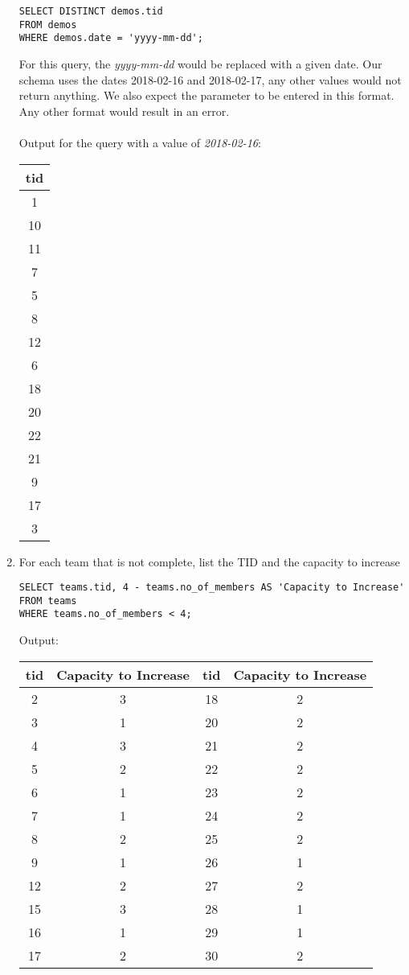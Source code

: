 \documentclass[11pt,letterpaper]{article}
\begin{document}
\begin{enumerate}
\begin{verbatim}
SELECT DISTINCT demos.tid 
FROM demos 
WHERE demos.date = 'yyyy-mm-dd';
\end{verbatim}
For this query, the \textit{yyyy-mm-dd} would be replaced with a given date. Our schema uses the dates 2018-02-16 and 2018-02-17, any other values would not return anything. We also expect the parameter to be entered in this format. Any other format would result in an error.\\
\\
Output for the query with a value of \textit{2018-02-16}:
\begin{center}
\begin{tabular}{ | c | }
 \hline
 tid \\
 \hline
 1 \\
 10 \\
 11 \\
 7 \\
 5 \\
 8 \\
 12 \\
 6 \\
 18 \\
 20 \\
 22 \\
 21 \\
 9 \\
 17 \\
 3 \\
 \hline
\end{tabular}
\end{center}

\item For each team that is not complete, list the TID and the capacity to increase

\begin{verbatim}
SELECT teams.tid, 4 - teams.no_of_members AS 'Capacity to Increase' 
FROM teams 
WHERE teams.no_of_members < 4;
\end{verbatim}
Output:
\begin{center}
\begin{tabular}{ | c | c | c | c | }
 \hline
 tid & Capacity to Increase & tid & Capacity to Increase\\
 \hline
 2 & 3 & 18 & 2 \\
 3 & 1 & 20 & 2 \\
 4 & 3 & 21 & 2 \\
 5 & 2 & 22 & 2 \\
 6 & 1 & 23 & 2 \\
 7 & 1 & 24 & 2 \\
 8 & 2 & 25 & 2 \\
 9 & 1 & 26 & 1 \\
 12 & 2 & 27 & 2 \\
 15 & 3 & 28 & 1 \\
 16 & 1 & 29 & 1 \\
 17 & 2 & 30 & 2 \\
 \hline
\end{tabular}
\end{center}


\end{enumerate}
\end{document}
